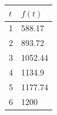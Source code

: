 \documentclass[10pt]{article}
\begin{document}
{%
 \begin{tabular}{| l | l |}
    \hline
    $t$ & $f(t)$\\
    \hline\hline
    1 & 588.17\\
    2 & 893.72\\
    3 & 1052.44\\
    4 & 1134.9\\
    5 & 1177.74\\
    6 & 1200\\
    \hline
    \end{tabular}
}
    \hfill\,
\end{document}
